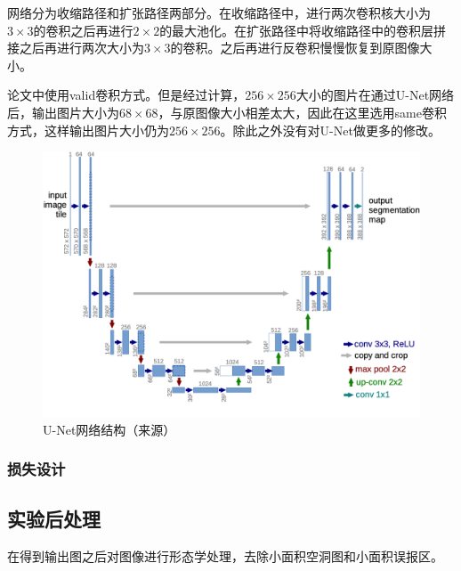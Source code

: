 网络分为收缩路径和扩张路径两部分。在收缩路径中，进行两次卷积核大小为$3\times 3$的卷积之后再进行$2\times 2$的最大池化。在扩张路径中将收缩路径中的卷积层拼接之后再进行两次大小为$3\times 3$的卷积。之后再进行反卷积慢慢恢复到原图像大小。

论文\cite{ronneberger2015u}中使用valid卷积方式。但是经过计算，$256\times 256$大小的图片在通过U-Net网络后，输出图片大小为$68\times 68$，与原图像大小相差太大，因此在这里选用same卷积方式，这样输出图片大小仍为$256\times 256$。除此之外没有对U-Net做更多的修改。
\begin{figure}[!t]
    \centering
    \includegraphics[scale=0.5]{Figures/unet_construction.png}
    \caption{U-Net网络结构（来源\cite{ronneberger2015u}）}
    \label{Fig:unet_construction}
\end{figure}

\subsubsection{损失设计}
\subsection{实验后处理}
在得到输出图之后对图像进行形态学处理，去除小面积空洞图和小面积误报区。